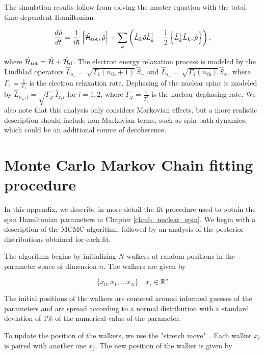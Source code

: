 The simulation results follow from solving the master equation with the total time-dependent Hamiltonian

\begin{equation}
\frac{d\hat{\rho}}{dt} = \frac{1}{i \hbar} \left[ \hat{\mathcal{H}}_{\text{tot}}, \hat{\rho} \right] + \sum_k \left( \hat{L}_k \hat{\rho} \hat{L}_k^\dagger - \frac{1}{2} \left\{ \hat{L}_k^\dagger \hat{L}_k, \hat{\rho} \right\} \right),
\end{equation}

where $\hat{\mathcal{H}}_{\text{tot}} = \hat{\mathcal{H}}_{\text{}} + \hat{\mathcal{H}}_{\text{d}}$. The electron energy relaxation process is modeled by the Lindblad operators $\hat{L}_{s_-} = \sqrt{\Gamma_{1} (\bar{n}_{\text{th}} + 1)} \, \hat{S}_{-}$ and $\hat{L}_{s_+} = \sqrt{\Gamma_{1} (\bar{n}_{\text{th}})} \, \hat{S}_{+}$, where $\Gamma_{1} = \frac{1}{T_1}$ is the electron relaxation rate. Dephasing of the nuclear spins is modeled by $\hat{L}_{n_\varphi,i} = \sqrt{\Gamma_{\varphi}} \, \hat{I}_{z,i}$ for $i=1,2$, where $\Gamma_{\varphi} = \frac{1}{T_2^*}$ is the nuclear dephasing rate. We also note that this analysis only considers Markovian effects, but a more realistic description should include non-Markovian terms, such as spin-bath dynamics, which could be an additional source of decoherence.


\chapter{Monte Carlo Markov Chain fitting procedure}
\label{app:mcmc_fit}

In this appendix, we describe in more detail the fit procedure used to obtain the spin Hamiltonian parameters in Chapter \ref{ch:nb_nuclear_spin}. We begin with a description of the MCMC algorithm, followed by an analysis of the posterior distributions obtained for each fit.

The algorithm begins by initializing $N$ walkers at random positions in the parameter space of dimension $n$. The walkers are given by

\begin{equation}
    \{x_0, x_1, \dots x_N\} \quad x_i \in \mathbb{R}^n
\end{equation}

The initial positions of the walkers are centered around informed guesses of the parameters and are spread according to a normal distribution with a standard deviation of 1\% of the numerical value of the parameter.

To update the position of the walkers, we use the "stretch move"~. Each walker $x_i$ is paired with another one $x_j$. The new position of the walker is given by

